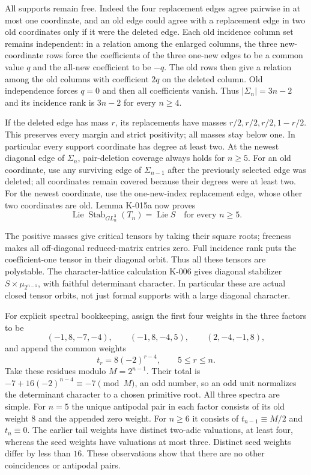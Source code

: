 All supports remain free.  Indeed the four replacement edges agree
pairwise in at most one coordinate, and an old edge could agree
with a replacement edge in two old coordinates only if it were
the deleted edge.  Each old incidence column set remains independent:
in a relation among the enlarged columns, the three new-coordinate
rows force the coefficients of the three one-new edges to be a
common value $q$ and the all-new coefficient to be $-q$.  The old
rows then give a relation among the old columns with coefficient
$2q$ on the deleted column.  Old independence forces $q=0$ and
then all coefficients vanish.  Thus $|\Sigma_n|=3n-2$ and its
incidence rank is $3n-2$ for every $n\ge4$.

If the deleted edge has mass $r$, its replacements have masses
$r/2,r/2,r/2,1-r/2$.  This preserves every margin and strict
positivity; all masses stay below one.  In particular every support
coordinate has degree at least two.  At the newest diagonal edge
of $\Sigma_n$, pair-deletion coverage always holds for $n\ge5$.
For an old coordinate, use any surviving edge of
$\Sigma_{n-1}$ after the previously selected edge was deleted; all
coordinates remain covered because their degrees were at least two.
For the newest coordinate, use the one-new-index replacement edge,
whose other two coordinates are old.  Lemma K-015a now proves
\[
          \operatorname{Lie}\operatorname{Stab}_{GL_n^3}(T_n)
                         =\operatorname{Lie}S
                       \quad\text{for every }n\ge5.         \tag{K-015b}
\]

The positive masses give critical tensors by taking their square
roots; freeness makes all off-diagonal reduced-matrix entries zero.
Full incidence rank puts the coefficient-one tensor in their
diagonal orbit.  Thus all these tensors are polystable.
The character-lattice calculation K-006 gives diagonal stabilizer
$S\times\mu_{2^{n-1}}$, with faithful determinant character.
In particular these are actual closed tensor orbits, not just
formal supports with a large diagonal character.

For explicit spectral bookkeeping, assign the first four weights
in the three factors to be
\[
 (-1,8,-7,-4),\qquad(-1,8,-4,5),\qquad(2,-4,-1,8),
                                                               \tag{K-015c}
\]
and append the common weights
\[
              t_r=8(-2)^{r-4},\qquad 5\le r\le n.
                                                               \tag{K-015d}
\]
Take these residues modulo $M=2^{n-1}$.  Their total is
$-7+16(-2)^{n-4}\equiv-7\pmod M$, an odd number, so an odd unit
normalizes the determinant character to a chosen primitive root.
All three spectra are simple.  For $n=5$ the unique antipodal pair
in each factor consists of its old weight $8$ and the appended zero
weight.  For $n\ge6$ it consists of $t_{n-1}\equiv M/2$ and
$t_n\equiv0$.  The earlier tail weights have distinct two-adic
valuations, at least four, whereas the seed weights have valuations
at most three.  Distinct seed weights differ by less than $16$.
These observations show that there are no other coincidences or
antipodal pairs.

